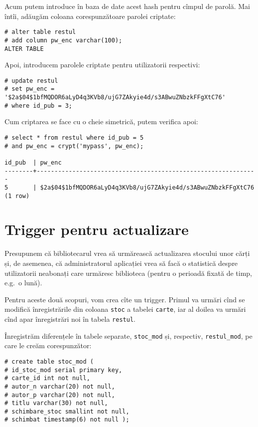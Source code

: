 Acum putem introduce în baza de date acest hash pentru cîmpul de parolă.
Mai întîi, adăugăm coloana corespunzătoare parolei criptate:

{
  \small
\begin{verbatim}
# alter table restul
# add column pw_enc varchar(100);
ALTER TABLE
\end{verbatim}
}

Apoi, introducem parolele criptate pentru utilizatorii respectivi:

{
  \small
\begin{verbatim}
# update restul
# set pw_enc = '$2a$04$1bfMQDOR6aLyD4q3KVb8/ujG7ZAkyie4d/s3ABwuZNbzkFFgXtC76' 
# where id_pub = 3;
\end{verbatim}
}

Cum criptarea se face cu o cheie simetrică, putem verifica apoi:

{
  \small
\begin{verbatim}
# select * from restul where id_pub = 5 
# and pw_enc = crypt('mypass', pw_enc);

id_pub  | pw_enc
--------+--------------------------------------------------------------
5       | $2a$04$1bfMQDOR6aLyD4q3KVb8/ujG7ZAkyie4d/s3ABwuZNbzkFFgXtC76
(1 row)
\end{verbatim}
}


\section{Trigger pentru actualizare}

Presupunem că bibliotecarul vrea să urmărească actualizarea stocului
unor cărți și, de asemenea, că administratorul aplicației vrea să facă
o statistică despre utilizatorii neabonați care urmăresc biblioteca
(pentru o perioadă fixată de timp, e.g.\ o lună).

Pentru aceste două scopuri, vom crea cîte un trigger. Primul va urmări
cînd se modifică înregistrările din coloana \texttt{stoc} a tabelei
\texttt{carte}, iar al doilea va urmări cînd apar înregistrări noi în
tabela \texttt{restul}.

Înregistrăm diferențele în tabele separate, \texttt{stoc\_mod} și,
respectiv, \texttt{restul\_mod}, pe care le creăm corespunzător:

{
  \small
\begin{verbatim}
# create table stoc_mod (
# id_stoc_mod serial primary key,
# carte_id int not null,
# autor_n varchar(20) not null,
# autor_p varchar(20) not null,
# titlu varchar(30) not null,
# schimbare_stoc smallint not null,
# schimbat timestamp(6) not null );
\end{verbatim}
}

